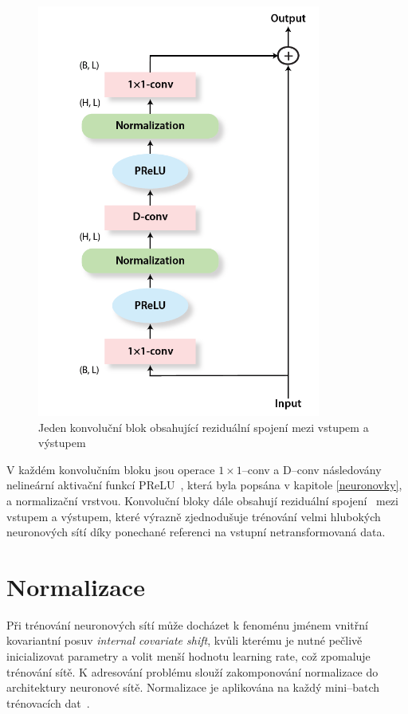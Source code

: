 \begin{figure}[H]
    \centering
    \includegraphics[scale=0.5]{obrazky-figures/conv-res-block.png}
    \caption{\label{fig:tasnet-convblock}Jeden konvoluční blok obsahující reziduální spojení mezi vstupem a výstupem}
\end{figure}

V každém konvolučním bloku jsou operace $1 \times 1$--conv a D--conv následovány nelineární aktivační funkcí PReLU~\cite{he2015delving}, která byla popsána v kapitole \ref{neuronovky}, a normalizační vrstvou. Konvoluční bloky dále obsahují reziduální spojení~\cite{he2015deep} mezi vstupem a výstupem, které výrazně zjednodušuje trénování velmi hlubokých neuronových sítí díky ponechané referenci na vstupní netransformovaná data.


\section{Normalizace}
Při trénování neuronových sítí může docházet k fenoménu jménem  vnitřní kovariantní posuv \textit{internal covariate shift}, kvůli kterému je nutné pečlivě inicializovat parametry a volit menší hodnotu learning rate, což zpomaluje trénování sítě. K adresování problému slouží zakomponování normalizace do architektury neuronové sítě. Normalizace je aplikována na každý mini--batch trénovacích dat~\cite{ioffe2015batch}\cite{ba2016layer}.

